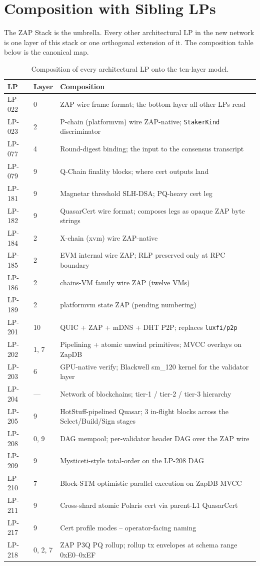 \section{Composition with Sibling LPs}
\label{sec:composition}

The ZAP Stack is the umbrella. Every other architectural LP in the
new network is one layer of this stack or one orthogonal extension of
it. The composition table below is the canonical map.

\begin{table}[h]
\centering
\small
\begin{tabular}{@{}llp{8cm}@{}}
\toprule
\textbf{LP} & \textbf{Layer} & \textbf{Composition} \\
\midrule
LP-022 & 0 & ZAP wire frame format; the bottom layer all other LPs read \\
LP-023 & 2 & P-chain (platformvm) wire ZAP-native; \texttt{StakerKind} discriminator \\
LP-077 & 4 & Round-digest binding; the input to the consensus transcript \\
LP-079 & 9 & Q-Chain finality blocks; where cert outputs land \\
LP-181 & 9 & Magnetar threshold SLH-DSA; PQ-heavy cert leg \\
LP-182 & 9 & QuasarCert wire format; composes legs as opaque ZAP byte strings \\
LP-184 & 2 & X-chain (xvm) wire ZAP-native \\
LP-185 & 2 & EVM internal wire ZAP; RLP preserved only at RPC boundary \\
LP-186 & 2 & chains-VM family wire ZAP (twelve VMs) \\
LP-189 & 2 & platformvm state ZAP (pending numbering) \\
LP-201 & 10 & QUIC + ZAP + mDNS + DHT P2P; replaces \texttt{luxfi/p2p} \\
LP-202 & 1, 7 & Pipelining + atomic unwind primitives; MVCC overlays on ZapDB \\
LP-203 & 6 & GPU-native verify; Blackwell sm\_120 kernel for the validator layer \\
LP-204 & --- & Network of blockchains; tier-1 / tier-2 / tier-3 hierarchy \\
LP-205 & 9 & HotStuff-pipelined Quasar; 3 in-flight blocks across the Select/Build/Sign stages \\
LP-208 & 0, 9 & DAG mempool; per-validator header DAG over the ZAP wire \\
LP-209 & 9 & Mysticeti-style total-order on the LP-208 DAG \\
LP-210 & 7 & Block-STM optimistic parallel execution on ZapDB MVCC \\
LP-211 & 9 & Cross-shard atomic Polaris cert via parent-L1 QuasarCert \\
LP-217 & 9 & Cert profile modes -- operator-facing naming \\
LP-218 & 0, 2, 7 & ZAP P3Q PQ rollup; rollup tx envelopes at schema range 0xE0--0xEF \\
\bottomrule
\end{tabular}
\caption{Composition of every architectural LP onto the ten-layer
model.}
\label{tab:composition}
\end{table}


